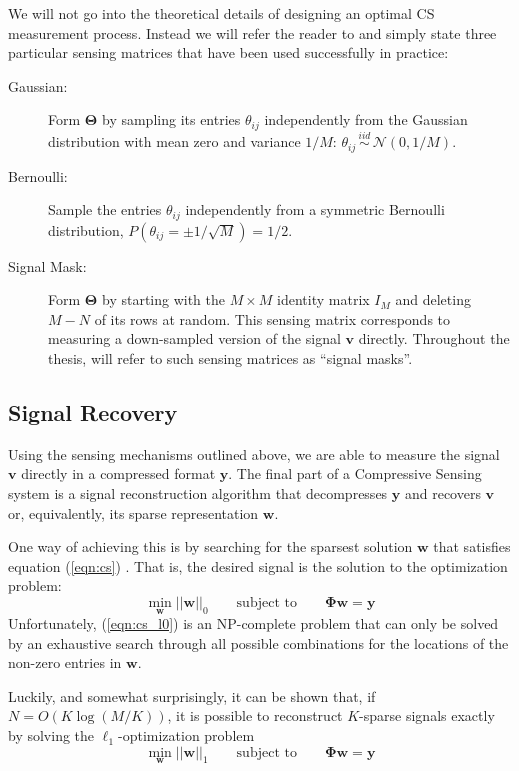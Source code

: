 We will not go into the theoretical details of designing an optimal CS measurement process. Instead we will refer the reader to \cite{candes2008} and simply state three particular sensing matrices that have been used successfully in practice:
\begin{description}
\item[Gaussian:] Form $\bm\Theta$ by sampling its entries $\theta_{ij}$ independently from the Gaussian distribution with mean zero and variance $1/M$: $\theta_{ij}\, \stackrel{iid}{\sim}\, \mathcal{N}(0,1/M)$.
\item[Bernoulli:] Sample the entries $\theta_{ij}$ independently from a symmetric Bernoulli distribution, $P(\theta_{ij} = \pm 1/\sqrt{M}) = 1/2$. 
\item[Signal Mask:] Form $\bm\Theta$ by starting with the $M\times M$ identity matrix $I_M$ and deleting $M-N$ of its rows at random. This sensing matrix corresponds to measuring a down-sampled version of the signal $\bm v$ directly. Throughout the thesis, will refer to such sensing matrices as ``signal masks''. 
\end{description}

\subsection{Signal Recovery}
Using the sensing mechanisms outlined above, we are able to measure the signal $\bm v$ directly in a compressed format $\bm y$.
The final part of a Compressive Sensing system is a signal reconstruction algorithm that decompresses $\bm y$ and recovers $\bm v$ or, equivalently, its sparse representation $\bm w$.

One way of achieving this is by searching for the sparsest solution $\bm w$ that satisfies equation (\ref{eqn:cs}) \cite{baraniuk2007}.
That is, the desired signal is the solution to the optimization problem:
\begin{equation}
\label{eqn:cs_l0}
  \min_{\bm w} ||\bm w||_0 \qquad \mbox{subject to} \qquad \bm\Phi\bm w = \bm y
\end{equation}
Unfortunately, (\ref{eqn:cs_l0}) is an NP-complete problem that can only be solved by an exhaustive search through all possible combinations for the locations of the non-zero entries in $\bm w$.

Luckily, and somewhat surprisingly, it can be shown that, if $N = O(K\log(M/K))$, it is possible to reconstruct $K$-sparse signals exactly by solving the $\ell_1$-optimization problem \cite{baraniuk2007,candes2008}
\begin{equation}
\label{eqn:cs_l1}
  \min_{\bm w} ||\bm w||_1 \qquad \mbox{subject to} \qquad \bm\Phi\bm w = \bm y
\end{equation}

